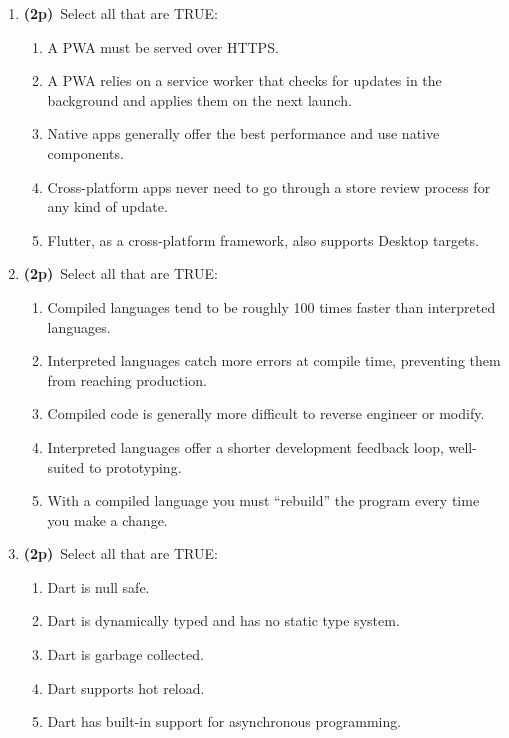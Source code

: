 \documentclass[11pt]{article}
\newcommand{\pts}{\textbf{(2p)}~}
\begin{document}
\begin{enumerate}
    \item \pts Select all that are TRUE:
    \begin{enumerate}
      \item A PWA must be served over HTTPS.
      \item A PWA relies on a service worker that checks for updates in the background and applies them on the next launch.
      \item Native apps generally offer the best performance and use native components.
      \item Cross-platform apps never need to go through a store review process for any kind of update.
      \item Flutter, as a cross-platform framework, also supports Desktop targets.
    \end{enumerate}

    \item \pts Select all that are TRUE:
    \begin{enumerate}
      \item Compiled languages tend to be roughly 100 times faster than interpreted languages.
      \item Interpreted languages catch more errors at compile time, preventing them from reaching production.
      \item Compiled code is generally more difficult to reverse engineer or modify.
      \item Interpreted languages offer a shorter development feedback loop, well-suited to prototyping.
      \item With a compiled language you must ``rebuild'' the program every time you make a change.
    \end{enumerate}

    \item \pts Select all that are TRUE:
    \begin{enumerate}
      \item Dart is null safe.
      \item Dart is dynamically typed and has no static type system.
      \item Dart is garbage collected.
      \item Dart supports hot reload.
      \item Dart has built-in support for asynchronous programming.
    \end{enumerate}


\end{enumerate}
\end{document}
